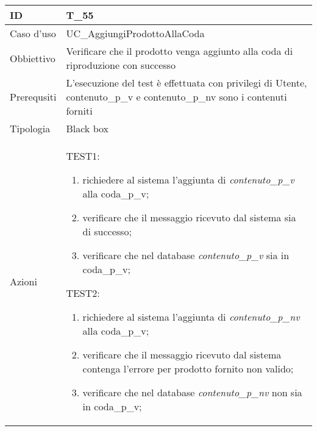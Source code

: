 \begin{table}[hb]
    \centering
    \begin{tabular}{ |p{2cm}|p{10cm}|  }
        \hline
        ID          & T\_55                                                                 \\\hline
        Caso d'uso  & UC\_AggiungiProdottoAllaCoda                                                    \\\hline
        Obbiettivo  & Verificare che il prodotto venga aggiunto alla coda di riproduzione con successo \\\hline
        Prerequsiti & L'esecuzione del test è effettuata con privilegi di Utente, contenuto\_p\_v
        e contenuto\_p\_nv sono i contenuti forniti           \\\hline
        Tipologia   & Black box                                                             \\\hline
        Azioni      &
        TEST1:
        \begin{enumerate}[nosep, topsep=0pt]
            \item richiedere al sistema l'aggiunta di \emph{contenuto\_p\_v} alla coda\_p\_v;
            \item verificare che il messaggio ricevuto dal sistema sia di successo;
            \item verificare che nel database \emph{contenuto\_p\_v} sia in coda\_p\_v;
        \end{enumerate}
        \vspace{0.5cm} TEST2:
        \begin{enumerate}[nosep, topsep=0pt]
            \item richiedere al sistema l'aggiunta di \emph{contenuto\_p\_nv} alla coda\_p\_v;
            \item verificare che il messaggio ricevuto dal sistema contenga l'errore per
            prodotto fornito non valido;
            \item verificare che nel database \emph{contenuto\_p\_nv} non sia in coda\_p\_v;
        \end{enumerate}
        \\\hline
    \end{tabular}
\end{table}

